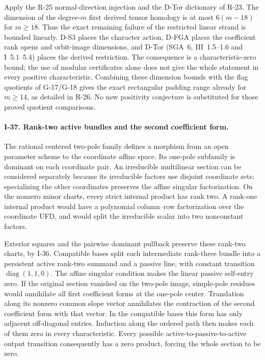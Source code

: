 Apply the R-25 normal-direction injection and the D-Tor dictionary
of R-23. The dimension of the degree-$m$ first derived tensor
homology is at most $6(m-18)$ for $m\ge18$. Thus the exact remaining
failure of the restricted linear strand is bounded linearly.
D-S3 places the character action, D-FGA places the coefficient
rank opens and orbit-image dimensions, and D-Tor (SGA~6, III~1.5--1.6
and I~5.1--5.4) places the derived restriction. The consequence is a
characteristic-zero bound; the use of modular certificates alone
does not give the whole statement in every positive characteristic.
Combining these dimension bounds with the flag quotients of
G-17/G-18 gives the exact rectangular padding range already for
$m\ge14$, as detailed in R-26. No new positivity conjecture is
substituted for those proved quotient comparisons.

\paragraph{I-37. Rank-two active bundles and the second coefficient form.}
The rational centered two-pole family defines a morphism from an
open parameter scheme to the coordinate affine space. Its one-pole
subfamily is dominant on each coordinate pair. An irreducible
multilinear section can be considered separately because its
irreducible factors use disjoint coordinate sets; specializing the
other coordinates preserves the affine singular factorization.
On the nonzero minor charts, every strict internal product has
rank two. A rank-one internal product would have a polynomial
column--row factorization over the coordinate UFD, and would split
the irreducible scalar into two nonconstant factors.

Exterior squares and the pairwise dominant pullback preserve these
rank-two charts, by I-36. Compatible bases split each intermediate
rank-three bundle into a persistent active rank-two summand and
a passive line, with constant transition $\operatorname{diag}(1,1,0)$.
The affine singular condition makes the linear passive self-entry
zero. If the original section vanished on the two-pole image,
simple-pole residues would annihilate all first coefficient forms
at the one-pole center. Translation along its nonzero common
slope vector annihilates the contraction of the second coefficient
form with that vector. In the compatible bases this form has only
adjacent off-diagonal entries. Induction along the ordered path
then makes each of them zero in every characteristic. Every
possible active-to-passive-to-active output transition consequently
has a zero product, forcing the whole section to be zero.

